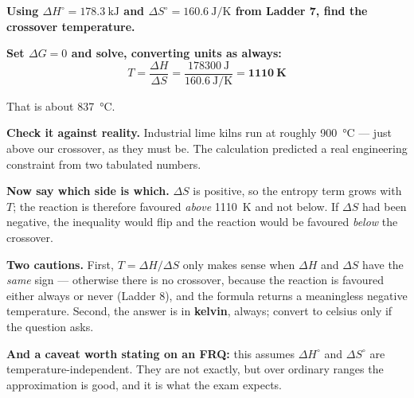 \documentclass{apchem-worksheet}
\begin{document}
\begin{workedexample}
\textbf{Using $\Delta H^{\circ} = \SI{+178.3}{\kilo\joule}$ and
$\Delta S^{\circ} = \SI{+160.6}{\joule\per\kelvin}$ from Ladder 7,
find the crossover temperature.}

\textbf{Set $\Delta G = 0$ and solve, converting units as always:}
\[ T = \frac{\Delta H}{\Delta S}
     = \frac{\SI{178300}{\joule}}{\SI{160.6}{\joule\per\kelvin}}
     = \mathbf{\SI{1110}{\kelvin}} \]

That is about \SI{837}{\celsius}.

\textbf{Check it against reality.} Industrial lime kilns run at roughly
\SI{900}{\celsius} --- just above our crossover, as they must be. The
calculation predicted a real engineering constraint from two tabulated
numbers.

\textbf{Now say which side is which.} $\Delta S$ is positive, so the
entropy term grows with $T$; the reaction is therefore favoured
\emph{above} \SI{1110}{\kelvin} and not below. If $\Delta S$ had been
negative, the inequality would flip and the reaction would be favoured
\emph{below} the crossover.

\textbf{Two cautions.} First, $T = \Delta H / \Delta S$ only makes sense
when $\Delta H$ and $\Delta S$ have the \emph{same} sign --- otherwise
there is no crossover, because the reaction is favoured either always or
never (Ladder 8), and the formula returns a meaningless negative
temperature. Second, the answer is in \textbf{kelvin}, always; convert
to celsius only if the question asks.

\textbf{And a caveat worth stating on an FRQ:} this assumes
$\Delta H^{\circ}$ and $\Delta S^{\circ}$ are temperature-independent.
They are not exactly, but over ordinary ranges the approximation is
good, and it is what the exam expects.
\end{workedexample}
\end{document}
